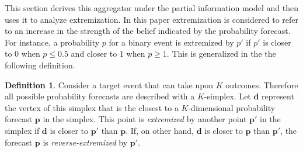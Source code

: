 \documentclass[11pt,twoside]{article}
\theoremstyle{definition}
\theoremstyle{definition}
\newtheorem{definition}[theorem]{Definition}
\begin{document}
This section derives this aggregator under the partial information model and then uses it to analyze extremization.  In this paper extremization is considered to refer to an increase in the strength of the belief indicated by the probability forecast. For instance, a probability $p$ for a binary event is extremized by $p'$ if $p'$ is closer to $0$ when $p \leq 0.5$ and closer to $1$ when $p \geq 1$.  This is generalized in the the following definition.
\begin{definition}
Consider a target event that can take upon $K$ outcomes. Therefore all possible probability forecasts are described with a $K$-simplex. Let $\boldsymbol{d}$ represent the vertex of this simplex that is the closest to a $K$-dimensional probability forecast $\boldsymbol{p}$ in the simplex. This point is \textit{extremized} by another point $\boldsymbol{p}'$ in the simplex if $\boldsymbol{d}$ is closer to $\boldsymbol{p}'$ than $\boldsymbol{p}$. If, on other hand, $\boldsymbol{d}$ is closer to $\boldsymbol{p}$ than $\boldsymbol{p}'$, the forecast $\boldsymbol{p}$ is \textit{reverse-extremized} by $\boldsymbol{p}'$.
\end{definition}
\end{document}
